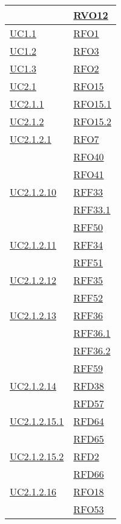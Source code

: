 \begin{longtable}{|>{\centering}m{5cm}|m{5cm}<{\centering}|}
	& \hyperlink{RVO12}{RVO12}\\ \hline
	\hyperlink{UC1.1}{UC1.1} & \hyperlink{RFO1}{RFO1}\\ \hline
	\hyperlink{UC1.2}{UC1.2} & \hyperlink{RFO3}{RFO3}\\ \hline
	\hyperlink{UC1.3}{UC1.3} & \hyperlink{RFO2}{RFO2}\\ \hline
	\hyperlink{UC2.1}{UC2.1} & \hyperlink{RFO15}{RFO15}\\ \hline
	\hyperlink{UC2.1.1}{UC2.1.1} & \hyperlink{RFO15.1}{RFO15.1}\\ \hline
	\hyperlink{UC2.1.2}{UC2.1.2} & \hyperlink{RFO15.2}{RFO15.2}\\ \hline
	\hyperlink{UC2.1.2.1}{UC2.1.2.1} & \hyperlink{RFO7}{RFO7}\\
	& \hyperlink{RFO40}{RFO40}\\
	& \hyperlink{RFO41}{RFO41}\\ \hline
	\hyperlink{UC2.1.2.10}{UC2.1.2.10} & \hyperlink{RFF33}{RFF33}\\
	& \hyperlink{RFF33.1}{RFF33.1}\\
	& \hyperlink{RFF50}{RFF50}\\ \hline
	\hyperlink{UC2.1.2.11}{UC2.1.2.11} & \hyperlink{RFF34}{RFF34}\\
	& \hyperlink{RFF51}{RFF51}\\ \hline
	\hyperlink{UC2.1.2.12}{UC2.1.2.12} & \hyperlink{RFF35}{RFF35}\\
	& \hyperlink{RFF52}{RFF52}\\ \hline
	\hyperlink{UC2.1.2.13}{UC2.1.2.13} & \hyperlink{RFF36}{RFF36}\\
	& \hyperlink{RFF36.1}{RFF36.1}\\
	& \hyperlink{RFF36.2}{RFF36.2}\\
	& \hyperlink{RFF59}{RFF59}\\ \hline
	\hyperlink{UC2.1.2.14}{UC2.1.2.14} & \hyperlink{RFD38}{RFD38}\\
	& \hyperlink{RFD57}{RFD57}\\ \hline
	\hyperlink{UC2.1.2.15.1}{UC2.1.2.15.1} & \hyperlink{RFD64}{RFD64}\\
	& \hyperlink{RFD65}{RFD65}\\ \hline
	\hyperlink{UC2.1.2.15.2}{UC2.1.2.15.2} & \hyperlink{RFD2}{RFD2}\\
	& \hyperlink{RFD66}{RFD66}\\ \hline
	\hyperlink{UC2.1.2.16}{UC2.1.2.16} & \hyperlink{RFO18}{RFO18}\\
	& \hyperlink{RFO53}{RFO53}\\

\end{longtable}
